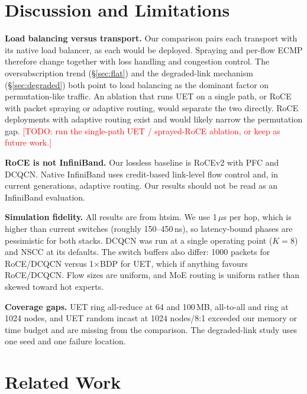 \documentclass[conference]{IEEEtran}
\newcommand{\todo}[1]{\textcolor{red}{[TODO: #1]}}
\begin{document}
\section{Discussion and Limitations}
\label{sec:discussion}

\textbf{Load balancing versus transport.}
Our comparison pairs each transport with its native load balancer, as each
would be deployed. Spraying and per-flow ECMP therefore change together with
loss handling and congestion control. The oversubscription trend
(\S\ref{sec:flat}) and the degraded-link mechanism (\S\ref{sec:degraded}) both
point to load balancing as the dominant factor on permutation-like traffic. An
ablation that runs UET on a single path, or RoCE with packet spraying or
adaptive routing, would separate the two directly. RoCE deployments with
adaptive routing exist and would likely narrow the permutation gap.
\todo{run the single-path UET / sprayed-RoCE ablation, or keep as future work.}

\textbf{RoCE is not InfiniBand.}
Our lossless baseline is RoCEv2 with PFC and DCQCN. Native InfiniBand uses
credit-based link-level flow control and, in current generations, adaptive
routing. Our results should not be read as an InfiniBand evaluation.

\textbf{Simulation fidelity.}
All results are from htsim. We use 1\,$\mu$s per hop, which is higher than
current switches (roughly 150--450\,ns), so latency-bound phases are pessimistic
for both stacks. DCQCN was run at a single operating point ($K{=}8$) and NSCC at
its defaults. The switch buffers also differ: 1000 packets for RoCE/DCQCN versus
1$\times$BDP for UET, which if anything favours RoCE/DCQCN. Flow sizes are
uniform, and MoE routing is uniform rather than skewed toward hot experts.

\textbf{Coverage gaps.}
UET ring all-reduce at 64 and 100\,MB, all-to-all and ring at 1024 nodes, and
UET random incast at 1024 nodes/8:1 exceeded our memory or time budget and are
missing from the comparison. The degraded-link study uses one seed and one
failure location.

\section{Related Work}
\end{document}
